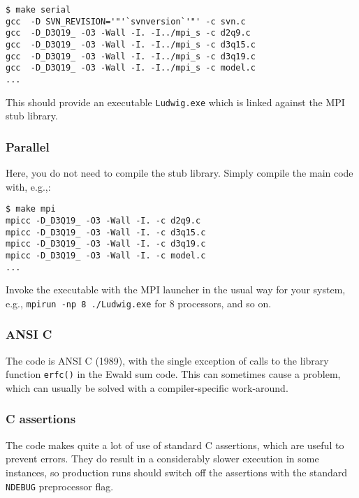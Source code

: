 \begin{verbatim}
$ make serial
gcc  -D SVN_REVISION='"'`svnversion`'"' -c svn.c
gcc  -D_D3Q19_ -O3 -Wall -I. -I../mpi_s -c d2q9.c
gcc  -D_D3Q19_ -O3 -Wall -I. -I../mpi_s -c d3q15.c
gcc  -D_D3Q19_ -O3 -Wall -I. -I../mpi_s -c d3q19.c
gcc  -D_D3Q19_ -O3 -Wall -I. -I../mpi_s -c model.c
...
\end{verbatim}

This should provide an executable \texttt{Ludwig.exe} which is linked
against the MPI stub library.

\subsubsection{Parallel}

Here, you do not need to compile the stub library. Simply compile
the main code with, e.g.,:
\begin{verbatim}
$ make mpi
mpicc -D_D3Q19_ -O3 -Wall -I. -c d2q9.c
mpicc -D_D3Q19_ -O3 -Wall -I. -c d3q15.c
mpicc -D_D3Q19_ -O3 -Wall -I. -c d3q19.c
mpicc -D_D3Q19_ -O3 -Wall -I. -c model.c
...
\end{verbatim}

Invoke the executable with the MPI launcher in the usual way for your
system, e.g., \texttt{mpirun -np 8 ./Ludwig.exe} for 8 processors,
and so on.

\subsubsection{ANSI C}

The code is ANSI C (1989), with the single exception of calls to the
library function \texttt{erfc()} in the Ewald sum code. This
can sometimes cause a problem, which can usually be solved with
a compiler-specific work-around.

\subsubsection{C assertions}

The code makes quite a lot of use of standard C assertions, which
are useful to prevent errors. They do result in a considerably
slower execution in some instances, so production runs should
switch off the assertions with the standard \texttt{NDEBUG}
preprocessor flag.

